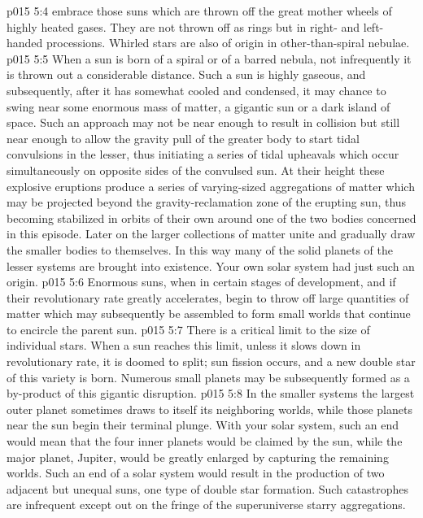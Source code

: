 \vs p015 5:4 \pc {}\bibnobreakspace {} embrace those suns which are thrown off the great mother wheels of highly heated gases. They are not thrown off as rings but in right\hyp{} and left\hyp{}handed processions. Whirled stars are also of origin in other\hyp{}than\hyp{}spiral nebulae.
\vs p015 5:5 \pc {}\bibnobreakspace {} When a sun is born of a spiral or of a barred nebula, not infrequently it is thrown out a considerable distance. Such a sun is highly gaseous, and subsequently, after it has somewhat cooled and condensed, it may chance to swing near some enormous mass of matter, a gigantic sun or a dark island of space. Such an approach may not be near enough to result in collision but still near enough to allow the gravity pull of the greater body to start tidal convulsions in the lesser, thus initiating a series of tidal upheavals which occur simultaneously on opposite sides of the convulsed sun. At their height these explosive eruptions produce a series of varying\hyp{}sized aggregations of matter which may be projected beyond the gravity\hyp{}reclamation zone of the erupting sun, thus becoming stabilized in orbits of their own around one of the two bodies concerned in this episode. Later on the larger collections of matter unite and gradually draw the smaller bodies to themselves. In this way many of the solid planets of the lesser systems are brought into existence. Your own solar system had just such an origin.
\vs p015 5:6 \pc {}\bibnobreakspace {} Enormous suns, when in certain stages of development, and if their revolutionary rate greatly accelerates, begin to throw off large quantities of matter which may subsequently be assembled to form small worlds that continue to encircle the parent sun.
\vs p015 5:7 \pc {}\bibnobreakspace {} There is a critical limit to the size of individual stars. When a sun reaches this limit, unless it slows down in revolutionary rate, it is doomed to split; sun fission occurs, and a new double star of this variety is born. Numerous small planets may be subsequently formed as a by\hyp{}product of this gigantic disruption.
\vs p015 5:8 \pc {}\bibnobreakspace {} In the smaller systems the largest outer planet sometimes draws to itself its neighboring worlds, while those planets near the sun begin their terminal plunge. With your solar system, such an end would mean that the four inner planets would be claimed by the sun, while the major planet, Jupiter, would be greatly enlarged by capturing the remaining worlds. Such an end of a solar system would result in the production of two adjacent but unequal suns, one type of double star formation. Such catastrophes are infrequent except out on the fringe of the superuniverse starry aggregations.

